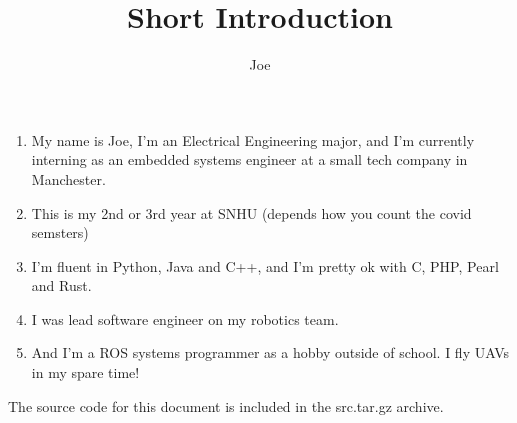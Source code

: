 \documentclass[a4paper,10pt]{beamer}
\title{Short Introduction}
\author{Joe}
\begin{document}
\maketitle

\begin{enumerate}
 \item My name is Joe, I'm an Electrical Engineering major, and I'm currently interning
       as an embedded systems engineer at a small tech company in Manchester.
 \item This is my 2nd or 3rd year at SNHU (depends how you count the covid semsters)
 \item I'm fluent in Python, Java and C++, and I'm pretty ok with C, PHP, Pearl and Rust.
 \item I was lead software engineer on my robotics team.
 \item And I'm a ROS systems programmer as a hobby outside of school. I fly UAVs in my spare time!
\end{enumerate}

The source code for this document is included in the src.tar.gz archive.
\end{document}
